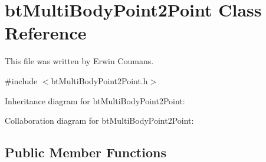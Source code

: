 \hypertarget{classbt_multi_body_point2_point}{\section{bt\+Multi\+Body\+Point2\+Point Class Reference}
\label{classbt_multi_body_point2_point}
}


This file was written by Erwin Coumans.  




{\ttfamily \#include $<$bt\+Multi\+Body\+Point2\+Point.\+h$>$}



Inheritance diagram for bt\+Multi\+Body\+Point2\+Point\+:


Collaboration diagram for bt\+Multi\+Body\+Point2\+Point\+:
\subsection*{Public Member Functions}
